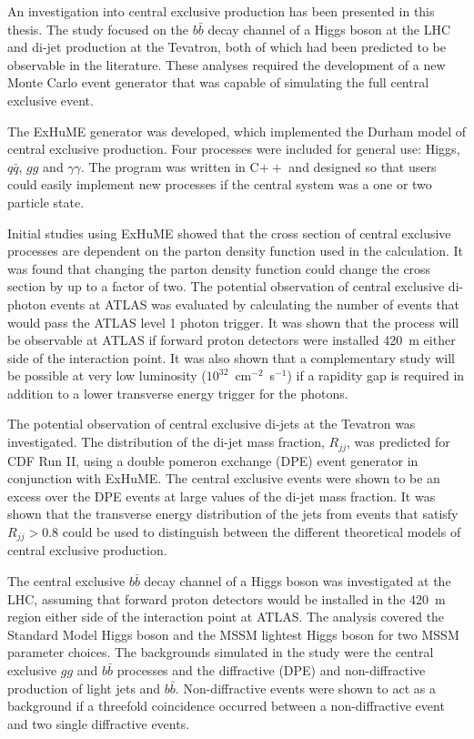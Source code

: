 An investigation into central exclusive production has been presented in this thesis. The study focused on the $b \bar{b}$ decay channel of a Higgs boson at the LHC and di-jet production at the Tevatron, both of which had been predicted to be observable in the literature. These analyses required the development of a new Monte Carlo event generator that was capable of simulating the full central exclusive event.

The ExHuME generator was developed, which implemented the Durham model of central exclusive production. Four processes were included for general use: Higgs, $q\bar{q}$, $gg$ and $\gamma\gamma$. The program was written in C$++$ and designed so that users could easily implement new processes if the central system was a one or two particle state. 

Initial studies using ExHuME showed that the cross section of central exclusive processes are dependent on the parton density function used in the calculation. It was found that changing the parton density function could change the cross section by up to a factor of two. The potential observation of central exclusive di-photon events at ATLAS was evaluated by calculating the number of events that would pass the ATLAS level 1 photon trigger. It was shown that the process will be observable at ATLAS if forward proton detectors were installed 420~m either side of the interaction point. It was also shown that a complementary study will be possible at very low luminosity ($10^{32}$~cm$^{-2}$~s$^{-1}$) if a rapidity gap is required in addition to a lower transverse energy trigger for the photons.

The potential observation of central exclusive di-jets at the Tevatron was investigated. The distribution of the di-jet mass fraction, $R_{jj}$, was predicted for CDF Run II, using a double pomeron exchange (DPE) event generator in conjunction with ExHuME. The central exclusive events were shown to be an excess over the DPE events at large values of the di-jet mass fraction. It was shown that the transverse energy distribution of the jets from events that satisfy $R_{jj}>0.8$ could be used to distinguish between the different theoretical models of central exclusive production.

The central exclusive $b \bar{b}$ decay channel of a Higgs boson was investigated at the LHC,  assuming that forward proton detectors would be installed in the 420~m region either side of the interaction point at ATLAS. The analysis covered the Standard Model Higgs boson and the MSSM lightest Higgs boson for two MSSM parameter choices. The backgrounds simulated in the study were the central exclusive $gg$ and $b\bar{b}$ processes and the diffractive (DPE) and non-diffractive production of light jets and $b\bar{b}$. Non-diffractive events were shown to act as a background if a threefold coincidence occurred between a non-diffractive event and two single diffractive events.

